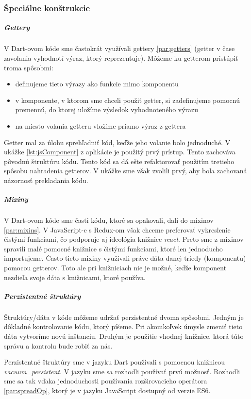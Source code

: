 

\subsubsection{Špeciálne konštrukcie}

\subparagraph{Gettery}
V Dart-ovom kóde sme častokrát využívali gettery \ref{par:getters} (getter v čase zavolania vyhodnotí výraz, ktorý reprezentuje). Môžeme ku getterom pristúpiť troma spôsobmi: 
\begin{itemize}
  \item definujeme tieto výrazy ako funkcie mimo komponentu
  \item v komponente, v ktorom sme chceli použiť getter, si zadefinujeme pomocnú premennú, do ktorej uložíme výsledok vyhodnoteného výrazu
  \item na miesto volania getteru vložíme priamo výraz z gettera
\end{itemize}

Getter mal za úlohu sprehľadniť kód, keďže jeho volanie bolo jednoduché.
V ukážke \ref{lst:jsComponent} z aplikácie je použitý prvý prístup. Tento zachováva pôvodnú štruktúru kódu. Tento kód sa dá ešte refaktorovať použitím tretieho spôsobu nahradenia getterov. V ukážke sme však zvolili prvý, aby bola zachovaná názornosť prekladania kódu.

\subparagraph{Mixiny}
V Dart-ovom kóde sme časti kódu, ktoré sa opakovali, dali do mixinov \ref{par:mixins}. V JavaScript-e s Redux-om však chceme preferovať vykreslenie čistými funkciami, čo podporuje aj ideológia knižnice \emph{react}. Preto sme z mixinov spravili malé pomocné knižnice s čistými funkciami, ktoré len jednoducho importujeme. Často tieto mixiny využívali práve dáta danej triedy (komponentu) pomocou getterov. Toto ale pri knižniciach nie je možné, keďže komponent nezdieľa svoje dáta s knižnicami, ktoré používa.

\subparagraph{Perzistentné štruktúry}
Štruktúry/dáta v kóde môžeme udržať perzistentné dvoma spôsobmi. 
Jedným je dôkladné kontrolovanie kódu, ktorý píšeme. Pri akomkoľvek úmysle zmeniť tieto dáta vytvoríme novú inštanciu.
Druhým je použitie vhodnej knižnice, ktorá túto správu a kontrolu bude robiť za nás.

Perzistentné štruktúry sme v jazyku Dart používali s pomocnou knižnicou \emph{vacuum\_persistent}. V jazyku \JS{} sme sa rozhodli používať prvú možnosť. Rozhodli sme sa tak vďaka jednoduchosti používania rozširovacieho operátora \ref{par:spreadOp}, ktorý je v jazyku JavaScript dostupný od verzie ES6.

